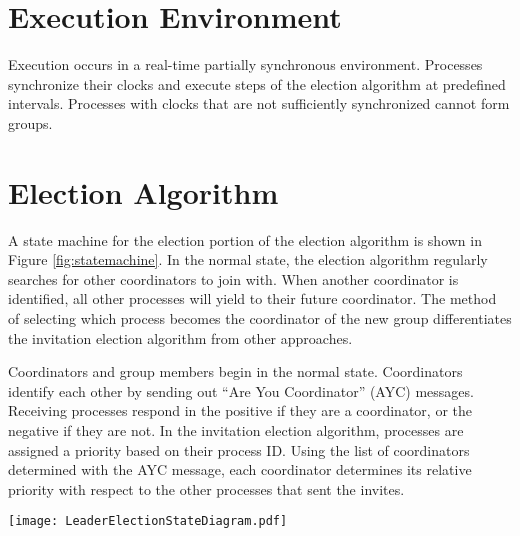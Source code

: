 


\section{Execution Environment}

Execution occurs in a real-time partially synchronous environment.
Processes synchronize their clocks and execute steps of the election algorithm at predefined intervals.
Processes with clocks that are not sufficiently synchronized cannot form groups.

\section{Election Algorithm}

A state machine for the election portion of the election algorithm is shown in Figure \ref{fig:statemachine}.
In the normal state, the election algorithm regularly searches for other coordinators to join with.
When another coordinator is identified, all other processes will yield to their future coordinator.
The method of selecting which process becomes the coordinator of the new group differentiates the invitation election algorithm from other approaches.

Coordinators and group members begin in the normal state.
Coordinators identify each other by sending out ``Are You Coordinator'' (AYC) messages.
Receiving processes respond in the positive if they are a coordinator, or the negative if they are not.
In the invitation election algorithm, processes are assigned a priority based on their process ID.
Using the list of coordinators determined with the AYC message, each coordinator determines its relative priority with respect to the other processes that sent the invites.

\begin{figure*}[!t]
\texttt{[image: LeaderElectionStateDiagram.pdf]}
\caption{State machine of a leader election. Processes start as coordinators in the ``Normal'' state and search for other coordinators to join with. Processes immediately respond to ``Are You Coordinator'' (AYC) messages they receive}
\label{fig:statemachine}
\end{figure*}

